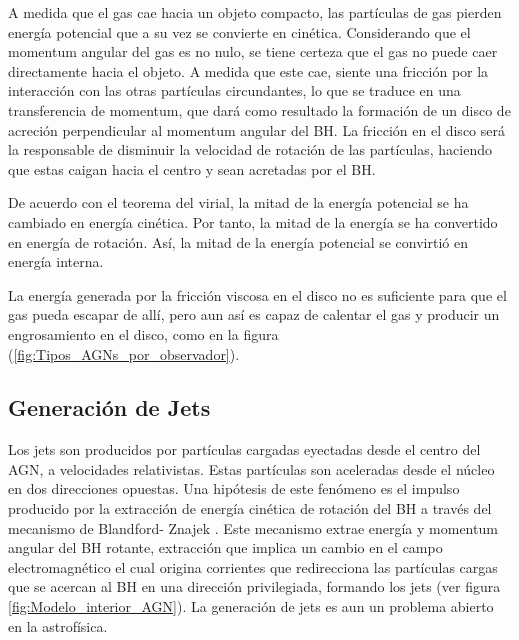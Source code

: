 A medida que el gas cae hacia un objeto compacto, las partículas de gas pierden energía potencial que a su vez se convierte en cinética. Considerando que el momentum angular del gas es no nulo, se tiene certeza que el gas no puede caer directamente hacia el objeto. A medida que este cae, siente una fricción por la interacción con las otras partículas circundantes, lo que se traduce en una transferencia de momentum, que dará como resultado la formación de un disco de acreción perpendicular al momentum angular del BH. La fricción en el disco será la responsable de disminuir la velocidad de rotación de las partículas, haciendo que estas caigan hacia el centro y sean acretadas por el BH.  

De acuerdo con el teorema del virial, la mitad de la energía potencial se ha cambiado en energía cinética. Por tanto, la mitad de la energía se ha convertido en energía de rotación. Así, la mitad de la energía potencial se convirtió en energía interna. 

La energía generada por la fricción viscosa en el disco no es suficiente para que el gas pueda escapar de allí, pero aun así es capaz de calentar el gas y producir un engrosamiento en el disco, como en la figura (\ref{fig:Tipos_AGNs_por_observador}).


	\subsection{Generación de Jets}
	\label{subsec:Generation_Jets}

Los jets son producidos por partículas cargadas eyectadas desde el centro del AGN, a velocidades relativistas. Estas partículas son aceleradas desde el núcleo en dos direcciones opuestas. Una hipótesis de este fenómeno es el impulso producido por la extracción de energía cinética de rotación del BH a través del mecanismo de Blandford- Znajek \cite{blandford1977}. 
Este mecanismo extrae energía y momentum angular del BH rotante,  extracción que implica un cambio en el campo electromagnético el cual origina corrientes que redirecciona las partículas cargas que se acercan al BH en una dirección privilegiada, formando los jets
(ver figura  \ref{fig:Modelo_interior_AGN}).
La generación de jets es aun un problema abierto en la astrofísica.%

